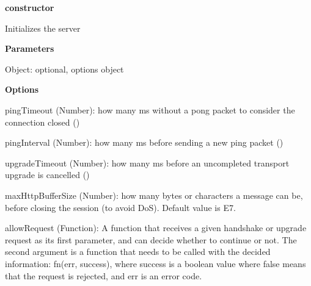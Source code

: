 \begin{DoxyItemize}
\item {\bfseries constructor}
\begin{DoxyItemize}
\item Initializes the server
\item {\bfseries Parameters}
\begin{DoxyItemize}
\item {\ttfamily Object}\+: optional, options object
\end{DoxyItemize}
\item {\bfseries Options}
\begin{DoxyItemize}
\item {\ttfamily ping\+Timeout} ({\ttfamily Number})\+: how many ms without a pong packet to consider the connection closed ({})
\item {\ttfamily ping\+Interval} ({\ttfamily Number})\+: how many ms before sending a new ping packet ({})
\item {\ttfamily upgrade\+Timeout} ({\ttfamily Number})\+: how many ms before an uncompleted transport upgrade is cancelled ({})
\item {\ttfamily max\+Http\+Buffer\+Size} ({\ttfamily Number})\+: how many bytes or characters a message can be, before closing the session (to avoid DoS). Default value is {\+E7}.
\item {\ttfamily allow\+Request} ({\ttfamily Function})\+: A function that receives a given handshake or upgrade request as its first parameter, and can decide whether to continue or not. The second argument is a function that needs to be called with the decided information\+: {\ttfamily fn(err, success)}, where {\ttfamily success} is a boolean value where false means that the request is rejected, and err is an error code.

\end{DoxyItemize}
\end{DoxyItemize}
\end{DoxyItemize}
